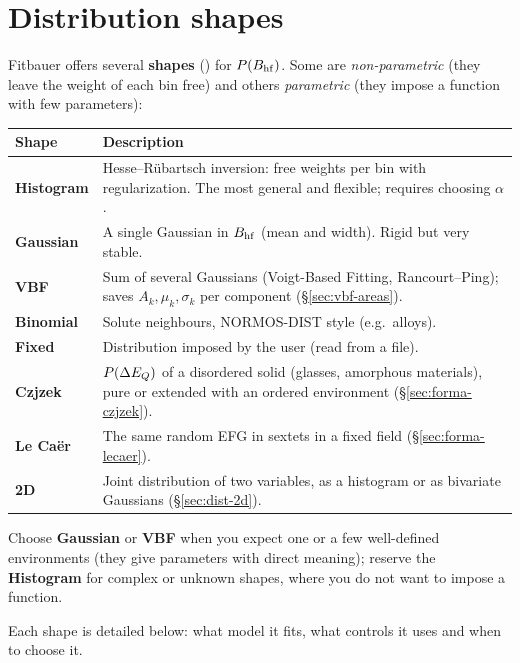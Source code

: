 \section{Distribution shapes}
\label{sec:formas-dist}

Fitbauer offers several \textbf{shapes} () for $P(B_{\mathrm{hf}})$. Some are
\emph{non-parametric} (they leave the weight of each bin free) and others
\emph{parametric} (they impose a function with few parameters):

\begin{center}
\begin{tabular}{@{}lp{}@{}}
\toprule
\textbf{Shape} & \textbf{Description} \\
\midrule
\textbf{Histogram} & Hesse--Rübartsch inversion: free weights per bin with
regularization. The most general and flexible; requires choosing $\alpha$. \\[3pt]
\textbf{Gaussian} & A single Gaussian in $B_{\mathrm{hf}}$ (mean and width). Rigid but very
stable. \\[3pt]
\textbf{VBF} & Sum of several Gaussians (Voigt-Based Fitting, Rancourt--Ping); saves
$A_k, \mu_k, \sigma_k$ per component (\S\ref{sec:vbf-areas}). \\[3pt]
\textbf{Binomial} & Solute neighbours, NORMOS-DIST style (e.g.\
alloys). \\[3pt]
\textbf{Fixed} & Distribution imposed by the user (read from a file). \\[3pt]
\textbf{Czjzek} & $P(\Delta E_{Q})$ of a disordered solid (glasses, amorphous materials),
pure or extended with an ordered environment (\S\ref{sec:forma-czjzek}). \\[3pt]
\textbf{Le Caër} & The same random EFG in sextets in a fixed field
(\S\ref{sec:forma-lecaer}). \\[3pt]
\textbf{2D} & Joint distribution of two variables, as a histogram or as bivariate
Gaussians (\S\ref{sec:dist-2d}). \\
\bottomrule
\end{tabular}
\end{center}

\begin{truco}
Choose \textbf{Gaussian} or \textbf{VBF} when you expect one or a few well-defined
environments (they give parameters with direct meaning); reserve the
\textbf{Histogram} for complex or unknown shapes, where you do not want to impose a
function.
\end{truco}

Each shape is detailed below: what model it fits, what controls it uses and when to
choose it.

